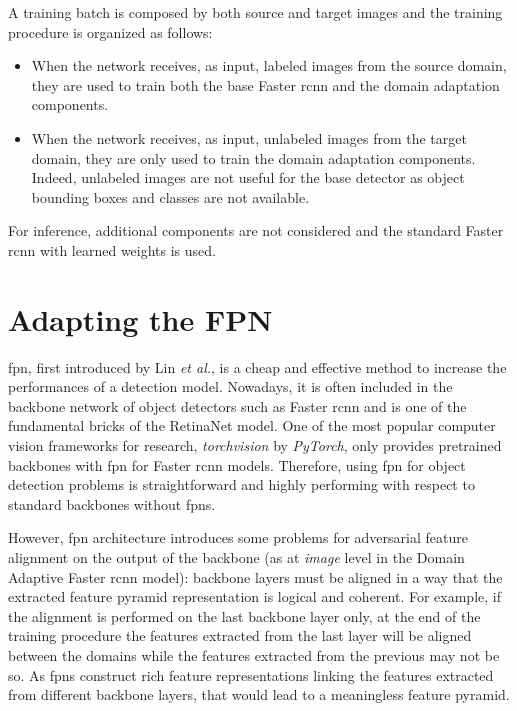 \documentclass[%
    corpo=12pt,
    twoside,
    stile=classica,   
    tipotesi=magistrale,
    evenboxes,
    english,
	numerazioneromana,
]{toptesi}
\begin{document}
\bigskip
A training batch is composed by both source and target images and the training procedure is organized as follows:
\begin{itemize}
	\item When the network receives, as input, labeled images from the source domain, they are used to train both the base Faster \gls{rcnn} and the domain adaptation components.
	\item When the network receives, as input, unlabeled images from the target domain, they are only used to train the domain adaptation components. Indeed, unlabeled images are not useful for the base detector as object bounding boxes and classes are not available.
\end{itemize}
For inference, additional components are not considered and the standard Faster \gls{rcnn} with learned weights is used.

\section{Adapting the FPN}
\acrfull{fpn}, first introduced by Lin \textit{et al.}\cite{lin2017feature}, is a cheap and effective method to increase the performances of a detection model. Nowadays, it is often included in the backbone network of object detectors such as Faster \gls{rcnn} and is one of the fundamental bricks of the RetinaNet model. One of the most popular computer vision frameworks for research, \textit{torchvision} by \textit{PyTorch}\cite{paszke2019pytorch}, only provides pretrained backbones with \gls{fpn} for Faster \gls{rcnn} models. Therefore, using \gls{fpn} for object detection problems is straightforward and highly performing with respect to standard backbones without \glspl{fpn}.

However, \gls{fpn} architecture introduces some problems for adversarial feature alignment on the output of the backbone (as at \textit{image} level in the Domain Adaptive Faster \gls{rcnn} model): backbone layers must be aligned in a way that the extracted feature pyramid representation is logical and coherent. For example, if the alignment is performed on the last backbone layer only, at the end of the training procedure the features extracted from the last layer will be aligned between the domains while the features extracted from the previous may not be so. As \glspl{fpn} construct rich feature representations linking the features extracted from different backbone layers, that would lead to a meaningless feature pyramid.
\end{document}
